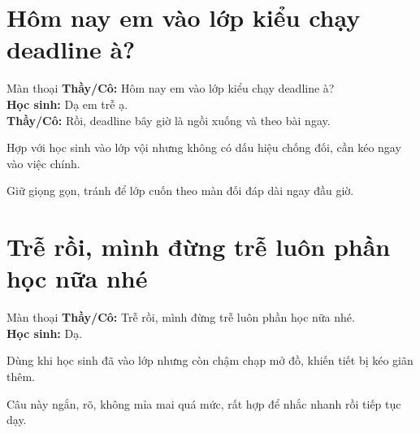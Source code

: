 \section{Hôm nay em vào lớp kiểu chạy deadline à?}
\begin{manthoai}{Màn thoại}
\textbf{Thầy/Cô:} Hôm nay em vào lớp kiểu chạy deadline à?\\
\textbf{Học sinh:} Dạ em trễ ạ.\\
\textbf{Thầy/Cô:} Rồi, deadline bây giờ là ngồi xuống và theo bài ngay.
\end{manthoai}
\begin{dungkhinào}
Hợp với học sinh vào lớp vội nhưng không có dấu hiệu chống đối, cần kéo ngay vào việc chính.
\end{dungkhinào}
\begin{nhipthem}
Giữ giọng gọn, tránh để lớp cuốn theo màn đối đáp dài ngay đầu giờ.
\end{nhipthem}
\ngancach

\section{Trễ rồi, mình đừng trễ luôn phần học nữa nhé}
\begin{manthoai}{Màn thoại}
\textbf{Thầy/Cô:} Trễ rồi, mình đừng trễ luôn phần học nữa nhé.\\
\textbf{Học sinh:} Dạ.
\end{manthoai}
\begin{dungkhinào}
Dùng khi học sinh đã vào lớp nhưng còn chậm chạp mở đồ, khiến tiết bị kéo giãn thêm.
\end{dungkhinào}
\begin{nhipthem}
Câu này ngắn, rõ, không mỉa mai quá mức, rất hợp để nhắc nhanh rồi tiếp tục dạy.
\end{nhipthem}
